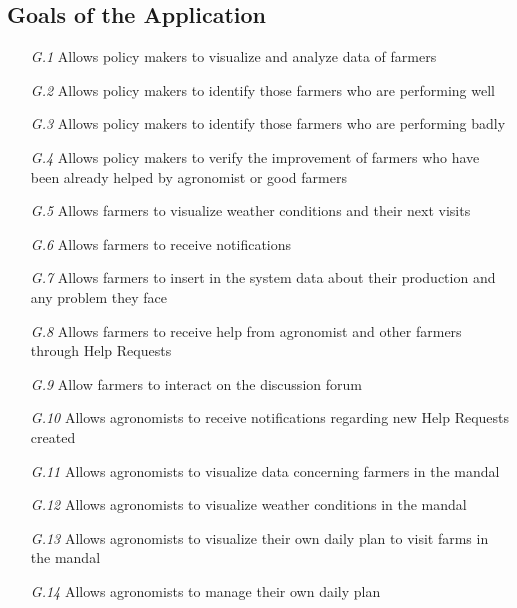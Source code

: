 \subsection{Goals of the Application}
\begin{itemize}
    \item [\textit {G.1}] Allows policy makers to visualize and analyze data of farmers
    \item [\textit {G.2}] Allows policy makers to identify those farmers who are performing well
    \item [\textit {G.3}] Allows policy makers to identify those farmers who are performing badly
    \item [\textit {G.4}] Allows policy makers to verify the improvement of farmers who have been already helped by agronomist or good farmers
    \item [\textit {G.5}] Allows farmers to visualize weather conditions and their next visits
    \item [\textit {G.6}] Allows farmers to receive notifications
    \item [\textit {G.7}] Allows farmers to insert in the system data about their production and any problem they face
    \item [\textit {G.8}] Allows farmers to receive help from agronomist and other farmers through Help Requests
    \item [\textit {G.9}] Allow farmers to interact on the discussion forum
    \item [\textit {G.10}] Allows agronomists to receive notifications regarding new Help Requests created
    \item [\textit {G.11}] Allows agronomists to visualize data concerning farmers in the mandal
    \item [\textit {G.12}] Allows agronomists to visualize weather conditions in the mandal
    \item [\textit {G.13}] Allows agronomists to visualize their own daily plan to visit farms in the mandal
    \item [\textit {G.14}] Allows agronomists to manage their own daily plan

\end{itemize}